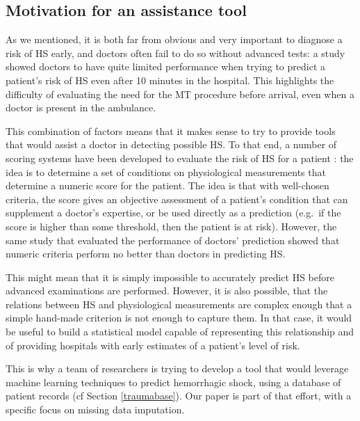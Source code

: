 		\subsection{Motivation for an assistance tool}

As we mentioned, it is both far from obvious and very important to diagnose a risk of HS early, and doctors often fail to do so without advanced tests: a study \cite{pommerening2015gestalt} showed doctors to have quite limited performance when trying to predict a patient's risk of HS even after 10 minutes in the hospital. This highlights the difficulty of evaluating the need for the MT procedure before arrival, even when a doctor is present in the ambulance.

This combination of factors means that it makes sense to try to provide tools that would assist a doctor in detecting possible HS. To that end, a number of scoring systems have been developed to evaluate the risk of HS for a patient \cite{nunez2009ABC} \cite{gonzalez2016resussitation_outcome} \cite{maegele2011TASH}: the idea is to determine a set of conditions on physiological measurements that determine a numeric score for the patient. The idea is that with well-chosen criteria, the score gives an objective assessment of a patient's condition that can supplement a doctor's expertise, or be used directly as a prediction (e.g.\ if the score is higher than some threshold, then the patient is at risk). However, the same study that evaluated the performance of doctors' prediction \cite{pommerening2015gestalt} showed that numeric criteria perform no better than doctors in predicting HS.

This might mean that it is simply impossible to accurately predict HS before advanced examinations are performed. However, it is also possible, that the relations between HS and physiological measurements are complex enough that a simple hand-made criterion is not enough to capture them. In that case, it would be useful to build a statistical model capable of representing this relationship and of providing hospitals with early estimates of a patient's level of risk. 

This is why a team of researchers is trying to develop a tool that would leverage machine learning techniques to predict hemorrhagic shock, using a database of patient records (cf Section \ref{traumabase}). Our paper is part of that effort, with a specific focus on missing data imputation.


